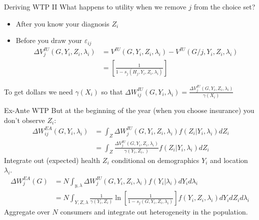 \documentclass[xcolor=pdftex,dvipsnames,table,mathserif,aspectratio=169]{beamer}
\begin{document}
\begin{frame}{Deriving WTP II}
What happens to utility when we remove $j$ from the choice set?
\begin{itemize}
\item \alert{After} you know your diagnosis $Z_i$
\item \alert{Before} you draw your $\varepsilon_{ij}$
\begin{align*}\Delta V_{j}^{I U}\left(G, Y_{i}, Z_{i}, \lambda_{i}\right)  &=V^{I U}\left(G, Y_{i}, Z_{i}, \lambda_{i}\right)-V^{I U}\left(G / j, Y_{i}, Z_{i}, \lambda_{i}\right) \\
&=\left[\frac{1}{1-s_{j}\left(H_{j}, Y_{i}, Z_{i}, \lambda_{i}\right)}\right]
\end{align*}
\end{itemize}
To get dollars we need $\gamma(X_i)$ so that $\Delta W_{ij}^{IU}(G,Y_i,\lambda_i) = \frac{\Delta V_{j}^{I U}\left(G, Y_{i}, Z_{i}, \lambda_{i}\right) }{\gamma(X_i)}$
\end{frame}

\begin{frame}{Ex-Ante WTP}
But at the beginning of the year (when you choose insurance) you don't observe $Z_i$:
\begin{align*}
\ \Delta W_{i j}^{E A}\left(G, Y_{i}, \lambda_{i}\right) &=\int_{Z} \Delta W_{j}^{I U}\left(G, Y_{i}, Z_{i}, \lambda_{i}\right) f\left(Z_{i} | Y_{i}, \lambda_{i}\right) d Z_{i} \\
 &=\int_{Z} \frac{\Delta V_{j}^{I U}\left(G, Y_{i}, Z_{i}, \lambda_{i}\right)}{\gamma\left(Y_{i}, Z_{i},\right)} f\left(Z_{i} | Y_{i}, \lambda_{i}\right) d Z_{i} 
 \end{align*}
 Integrate out (expected) health $Z_i$ conditional on demographics $Y_i$ and location $\lambda_i$.
\begin{align*}
 \Delta W_{j}^{E A}(G) &=N \int_{y, \lambda} \Delta W_{j}^{I U}\left(G, Y_{i}, Z_{i}, \lambda_{i}\right) f\left(Y_{i} | \lambda_{i}\right) d Y_{i} d \lambda_{i} \\ &=N \int_{Y, Z, \lambda} \frac{1}{\gamma\left(Y_{i}, Z_{i}\right)} \ln \left[\frac{1}{1-s_{j}\left(G, Y_{i}, Z_{i}, \lambda_{i}\right)}\right] f\left(Y_{i}, Z_{i}, \lambda_{i}\right) d Y_{i} d Z_{i} d \lambda_{i}
\end{align*}
Aggregate over $N$ consumers and integrate out heterogeneity in the population.
\end{frame}
\end{document}
